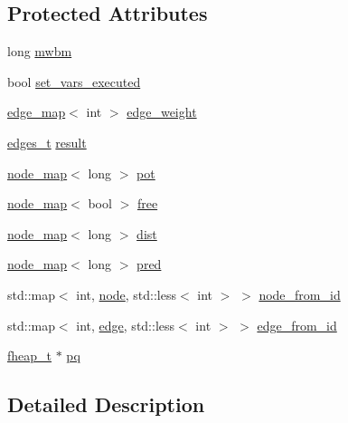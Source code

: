 \subsection*{Protected Attributes}
\begin{DoxyCompactItemize}
\item 
long \mbox{\hyperlink{classmwbmatching_a80e73b4ab7162ea265c48a93199fc172}{mwbm}}
\item 
bool \mbox{\hyperlink{classmwbmatching_ae871c52302b78ccf16a271ef099e0a3a}{set\+\_\+vars\+\_\+executed}}
\item 
\mbox{\hyperlink{classedge__map}{edge\+\_\+map}}$<$ int $>$ \mbox{\hyperlink{classmwbmatching_a9624508c4944bffc6a349aa76ce6964c}{edge\+\_\+weight}}
\item 
\mbox{\hyperlink{edge_8h_a8f9587479bda6cf612c103494b3858e3}{edges\+\_\+t}} \mbox{\hyperlink{classmwbmatching_aa6483fb0f23c87f29bb08f7abff80144}{result}}
\item 
\mbox{\hyperlink{classnode__map}{node\+\_\+map}}$<$ long $>$ \mbox{\hyperlink{classmwbmatching_ac44514154909580323c5d2e5c58e7d23}{pot}}
\item 
\mbox{\hyperlink{classnode__map}{node\+\_\+map}}$<$ bool $>$ \mbox{\hyperlink{classmwbmatching_a109911f7997e2f1b3293e505deb4a4cb}{free}}
\item 
\mbox{\hyperlink{classnode__map}{node\+\_\+map}}$<$ long $>$ \mbox{\hyperlink{classmwbmatching_aad0fd09452bf87f0e8e95c74441f5e8a}{dist}}
\item 
\mbox{\hyperlink{classnode__map}{node\+\_\+map}}$<$ long $>$ \mbox{\hyperlink{classmwbmatching_acea3c6ca4ec946e87a2850c2dc20479f}{pred}}
\item 
std\+::map$<$ int, \mbox{\hyperlink{classnode}{node}}, std\+::less$<$ int $>$ $>$ \mbox{\hyperlink{classmwbmatching_a805077195aac6c443b753b74da814c6f}{node\+\_\+from\+\_\+id}}
\item 
std\+::map$<$ int, \mbox{\hyperlink{classedge}{edge}}, std\+::less$<$ int $>$ $>$ \mbox{\hyperlink{classmwbmatching_afebc731e1dd5a37df6467258bfe07887}{edge\+\_\+from\+\_\+id}}
\item 
\mbox{\hyperlink{fheap_8h_a81491fcb8cde3f99611815852e42a9ad}{fheap\+\_\+t}} $\ast$ \mbox{\hyperlink{classmwbmatching_adeeeb1d1bc49ead5bce740bde6ae52bf}{pq}}
\end{DoxyCompactItemize}


\subsection{Detailed Description}


